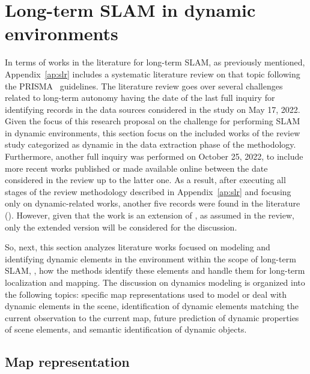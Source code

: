 \section{Long-term SLAM in dynamic environments}\label{sec:slam-dynamic}

In terms of works in the literature for long-term \gls{SLAM}, as previously mentioned, Appendix~\ref{ap:slr} includes a systematic literature review on that topic following the \gls{PRISMA}~\cite{methodology:prisma} guidelines. The literature review goes over several challenges related to long-term autonomy having the date of the last full inquiry for identifying records in the data sources considered in the study on May 17, 2022.
Given the focus of this research proposal on the challenge for performing \gls{SLAM} in dynamic environments, this section focus on the included works of the review study categorized as dynamic in the data extraction phase of the methodology. Furthermore, another full inquiry was performed on October 25, 2022, to include more recent works published or made available online between the date considered in the review up to the latter one.
As a result, after executing all stages of the review methodology described in Appendix~\ref{ap:slr} and focusing only on dynamic-related works, another five records were found in the literature (\cite{liu-et-al:2022:8,nielsen-hendeby:2022:9841255,guo-liu:2021:9739362,thomas-et-al:2022:9812297,fu-et-al:2022:3191794}). However, given that the work \cite{thomas-et-al:2022:9812297} is an extension of \cite{thomas-et-al:2021:9561701}, as assumed in the review, only the extended version will be considered for the discussion.

So, next, this section analyzes literature works focused on modeling and identifying dynamic elements in the environment within the scope of long-term \gls{SLAM}, \ie, how the methods identify these elements and handle them for long-term localization and mapping.
The discussion on dynamics modeling is organized into the following topics: specific map representations used to model or deal with dynamic elements in the scene, identification of dynamic elements matching the current observation to the current map, future prediction of dynamic properties of scene elements, and semantic identification of dynamic objects.




\subsection{Map representation}\label{sec:slam-dynamic:map}

